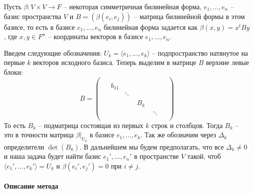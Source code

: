 Пусть $\beta\colon V\times V\to F$ -- некоторая симметричная билинейная форма, $e_1,\ldots,e_n$ -- базис пространства $V$ и $B = (\beta(e_i, e_j))$ -- матрица билинейной формы в этом базисе, то есть в базисе $e_1,\ldots,e_n$ билинейная форма задается как $\beta(x, y) = x^t B y$, где $x,y\in F^n$ -- координаты векторов в базисе $e_1,\ldots,e_n$.

Введем следующие обозначения: $U_k = \langle e_1,\ldots,e_k\rangle$  -- подпространство натянутое на первые $k$ векторов исходного базиса.
Теперь выделим в матрице $B$ верхние левые блоки:
\[
B =
\begin{pmatrix}
{\boxed{
\begin{matrix}
{
\boxed{
\begin{matrix}
{
\boxed{
\begin{matrix}
{\boxed{b_{11}}}&{}\\
{}&{\ddots}
\end{matrix}
}
}&{}\\
{}&{B_k}
\end{matrix}
}
}&{}\\
{}&{\ddots}
\end{matrix}
}
}&{}\\
{}&{}
\end{pmatrix}
\]
То есть $B_k$ -- подматрица состоящая из первых $k$ строк и столбцов.
Тогда $B_k$ -- это в точности матрица $\beta|_{U_k}$ в базисе $e_1,\ldots,e_k$.
Так же обозначим через $\Delta_k$ определители $\det (B_k)$.
В дальнейшем мы будем предполагать, что все $\Delta_k \neq 0$ и наша задача будет найти базис $e_1',\ldots,e_n'$ в пространстве $V$ такой, чтоб $\langle e_1',\ldots,e_k'\rangle = U_k$ и $\beta(e_i',e_j') = 0$ при $i\neq j$.


\paragraph{Описание метода}

